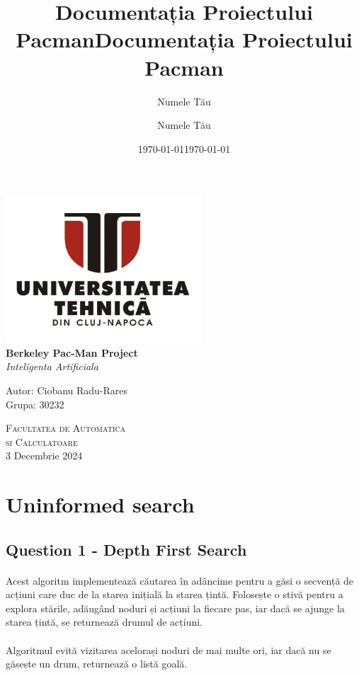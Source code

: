 \documentclass[12pt]{article}
\title{Documentația Proiectului Pacman}
\author{Numele Tău}
\date{\today}
\title{Documentația Proiectului Pacman}
\author{Numele Tău}
\date{\today}
\begin{document}
\begin{titlepage}
\begin{center}
\includegraphics[width=0.55\textwidth]{UTCN.png}~\\[2cm]
{ \LARGE
    \textbf{Berkeley Pac-Man Project}\\[0.4cm]
    \emph{Inteligenta Artificiala}\\[0.4cm]
}

{ \large
    Autor: Ciobanu Radu-Rares \\[0.1cm]
    Grupa: 30232\\[0.1cm]
}

\vfill
\textsc{\large Facultatea de Automatica\\si Calculatoare}\\[0.4cm]

{\large 3 Decembrie 2024}
    
\end{center}
\end{titlepage}
\newpage
\tableofcontents
\newpage

\section{Uninformed search}
    \subsection{Question 1 - Depth First Search}
    \paragraph{}Acest algoritm implementează căutarea în adâncime pentru a găsi o secvență de acțiuni care duc de la starea inițială la starea țintă. Folosește o stivă pentru a explora stările, adăugând noduri și acțiuni la fiecare pas, iar dacă se ajunge la starea țintă, se returnează drumul de acțiuni. \paragraph{}Algoritmul evită vizitarea acelorași noduri de mai multe ori, iar dacă nu se găsește un drum, returnează o listă goală.
\end{document}
